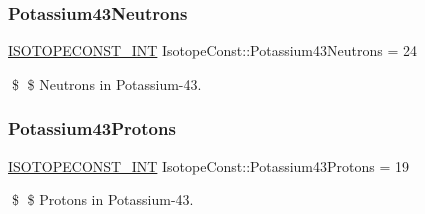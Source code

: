 \subsubsection{\texorpdfstring{Potassium43\+Neutrons}{Potassium43Neutrons}}
{\footnotesize\ttfamily \mbox{\hyperlink{group___isotope_const-_macros_ga5f18360b3e99483a35c32d789e62621c}{I\+S\+O\+T\+O\+P\+E\+C\+O\+N\+S\+T\+\_\+\+I\+NT}} Isotope\+Const\+::\+Potassium43\+Neutrons = 24}

\$ \$ Neutrons in Potassium-\/43. \mbox{\label{group___isotope_const-_potassium-_k43_gafd488cd74ce1ce07e2b35174aa077f93}} 
\subsubsection{\texorpdfstring{Potassium43\+Protons}{Potassium43Protons}}
{\footnotesize\ttfamily \mbox{\hyperlink{group___isotope_const-_macros_ga5f18360b3e99483a35c32d789e62621c}{I\+S\+O\+T\+O\+P\+E\+C\+O\+N\+S\+T\+\_\+\+I\+NT}} Isotope\+Const\+::\+Potassium43\+Protons = 19}

\$ \$ Protons in Potassium-\/43. 